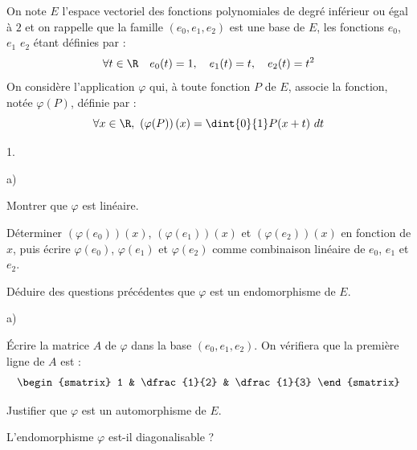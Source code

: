 \documentclass[11pt]{article}%
\begin{document}
\noindent
On note $E$ l'espace vectoriel des fonctions polynomiales de degré
inférieur ou égal à $2$ et on rappelle que la famille
$(e_{0},e_{1},e_{2})$ est une base de $E$, les fonctions $e_{0}$,
$e_{1}$ $e_{2}$ étant définies par :
\[
\forall t \in \R \quad e_{0}(t) = 1, \quad e_{1}(t) = t, \quad
e_{2}(t) = t^{2}
\]
On considère l'application $\varphi$ qui, à toute fonction $P$ de $E$,
associe la fonction, notée $\varphi(P)$, définie par :
\[
\forall x \in \R, \ \left(\varphi(P)\right)(x) = \dint{0}{1} P(x + t)
\ dt
\]
\begin{noliste}{1.}
 \setlength{\itemsep}{4mm}
\item
  \begin{noliste}{a)}
    \setlength{\itemsep}{2mm}
  \item Montrer que $\varphi$ est linéaire.

    
    
  \item Déterminer $\left(\varphi(e_{0})\right)(x)$,
    $\left(\varphi(e_{1})\right)(x)$ et
    $\left(\varphi(e_{2})\right)(x)$ en fonction de $x$, puis écrire
    $\varphi(e_{0})$, $\varphi(e_{1})$ et $\varphi(e_{2})$ comme
    combinaison linéaire de $e_{0}$, $e_{1}$ et $e_{2}$.

    

  \item Déduire des questions précédentes que $\varphi$ est un
    endomorphisme de $E$.

    
  \end{noliste}
  
  
  
  
\item
  \begin{noliste}{a)}
    \setlength{\itemsep}{2mm}
  \item Écrire la matrice $A$ de $\varphi$ dans la base
    $(e_{0},e_{1},e_{2})$. On vérifiera que la première ligne de $A$
    est :
    \[
    \begin{smatrix}
      1 & \dfrac{1}{2} & \dfrac{1}{3}
    \end{smatrix}
    \]

    

  \item Justifier que $\varphi$ est un automorphisme de $E$.

    

  \item L'endomorphisme $\varphi$ est-il diagonalisable ?

    
  \end{noliste}


\end{noliste}
\end{document}
